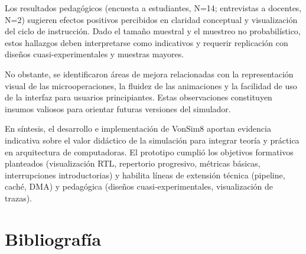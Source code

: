 \documentclass[12pt,oneside]{templates/unerthesis}
\begin{document}
Los resultados pedagógicos (encuesta a estudiantes, N=14; entrevistas a docentes, N=2) sugieren efectos positivos percibidos en claridad conceptual y visualización del ciclo de instrucción. Dado el tamaño muestral y el muestreo no probabilístico, estos hallazgos deben interpretarse como indicativos y requerir replicación con diseños cuasi-experimentales y muestras mayores.

No obstante, se identificaron áreas de mejora relacionadas con la representación visual de las microoperaciones, la fluidez de las animaciones y la facilidad de uso de la interfaz para usuarios principiantes. Estas observaciones constituyen insumos valiosos para orientar futuras versiones del simulador.

En síntesis, el desarrollo e implementación de VonSim8 aportan evidencia indicativa sobre el valor didáctico de la simulación para integrar teoría y práctica en arquitectura de computadoras. El prototipo cumplió los objetivos formativos planteados (visualización RTL, repertorio progresivo, métricas básicas, interrupciones introductorias) y habilita líneas de extensión técnica (pipeline, caché, DMA) y pedagógica (diseños cuasi-experimentales, visualización de trazas).

\hypertarget{Biblio}{%
\chapter{Bibliografía}\label{Biblio}}
\end{document}
